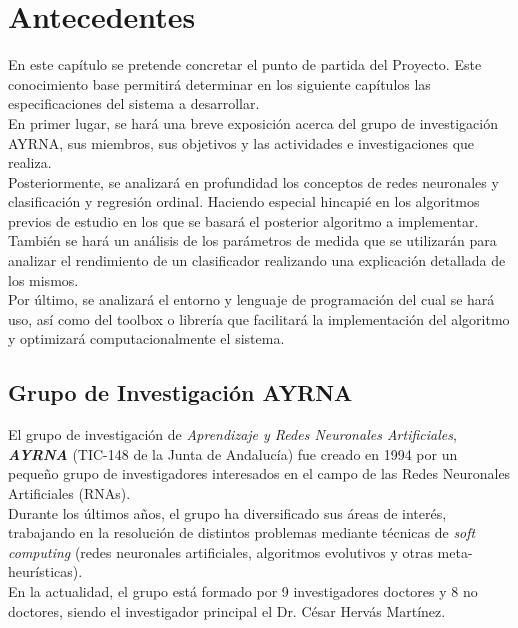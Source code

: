 \chapter{Antecedentes}
	
	En este capítulo se pretende concretar el punto de partida del Proyecto. Este conocimiento base permitirá determinar en los siguiente capítulos las especificaciones del sistema a desarrollar.\\
	
	En primer lugar, se hará una breve exposición acerca del grupo de investigación AYRNA, sus miembros, sus objetivos y las actividades e investigaciones que realiza.\\
	
	Posteriormente, se analizará en profundidad los conceptos de redes neuronales y clasificación y regresión ordinal. Haciendo especial hincapié en los algoritmos previos de estudio en los que se basará el posterior algoritmo a implementar. También se hará un análisis de los parámetros de medida que se utilizarán para analizar el rendimiento de un clasificador realizando una explicación detallada de los mismos.\\
	
	Por último, se analizará el entorno y lenguaje de programación del cual se hará uso, así como del toolbox o librería que facilitará la implementación del algoritmo y optimizará computacionalmente el sistema.
	
	\section{Grupo de Investigación AYRNA}
	
		El grupo de investigación de \textit{Aprendizaje y Redes Neuronales Artificiales}, \textit{\textbf{AYRNA}} (TIC-148 de la Junta de Andalucía) fue creado en 1994 por un pequeño grupo de investigadores interesados en el campo de las Redes Neuronales Artificiales (RNAs).\\
		
		Durante los últimos años, el grupo ha diversificado sus áreas de interés, trabajando en la resolución de distintos problemas mediante técnicas de \textit{soft computing} (redes neuronales artificiales, algoritmos evolutivos y otras meta-heurísticas).\\
		
		En la actualidad, el grupo está formado por 9 investigadores doctores y 8 no doctores, siendo el investigador principal el Dr. César Hervás Martínez.\\
		
